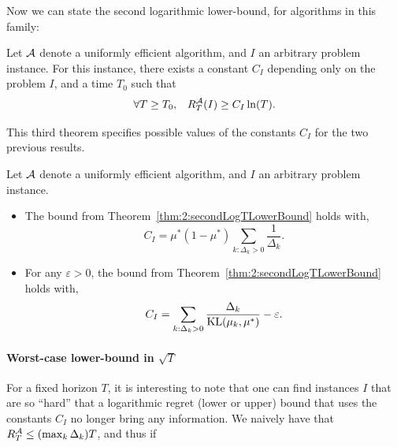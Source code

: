 Now we can state the second logarithmic lower-bound, for algorithms in this family:

\begin{theorem}\label{thm:2:secondLogTLowerBound}
    Let $\mathcal{A}$ denote a uniformly efficient algorithm,
    and $I$ an arbitrary problem instance.
    For this instance,
    there exists a constant $C_I$ depending only on the problem $I$,
    and a time $T_0$ such that
    \begin{equation}
        \forall T \geq T_0, \;\;\; R_T^{\mathcal{A}}(I) \geq C_I \ln(T).
    \end{equation}
\end{theorem}

This third theorem specifies possible values of the constants $C_I$ for the two previous results.

\begin{theorem}\label{thm:2:forSecondLogTLowerBound}
    Let $\mathcal{A}$ denote a uniformly efficient algorithm,
    and $I$ an arbitrary problem instance.
    \begin{itemize}
        \item
        The bound from Theorem~\ref{thm:2:secondLogTLowerBound} holds with,
        \begin{equation}\label{eq:2:forSecondLogTLowerBound}
            C_I = \mu^* (1 - \mu^*) \sum_{k: \Delta_k > 0} \frac{1}{\Delta_k}.
        \end{equation}
        \item
        For any $\varepsilon>0$, the bound from Theorem~\ref{thm:2:secondLogTLowerBound} holds with,
        \begin{equation}\label{eq:2:forSecondLogTLowerBound2}
            C_I = \sum_{k: \Delta_k > 0} \frac{\Delta_k}{\mathrm{KL}(\mu_k, \mu^*)} - \varepsilon.
        \end{equation}
    \end{itemize}
\end{theorem}




\paragraph{Worst-case lower-bound in $\sqrt{T}$}

For a fixed horizon $T$, it is interesting to note that one can find instances $I$ that are so ``hard'' that a logarithmic regret (lower or upper) bound that uses the constants $C_I$ no longer bring any information.
We naively have that $R_T^{\mathcal{A}} \leq (\max_k \Delta_k) T$, and thus if 

